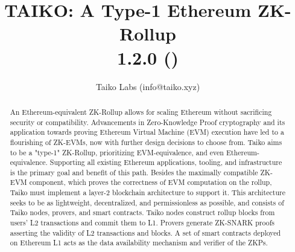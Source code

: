 \documentclass[9pt,oneside]{amsart}
\title[TAIKO: A Type-1 Ethereum ZK-Rollup\\ \smaller
\textbf{{1.2.0}}]{TAIKO: A Type-1 Ethereum ZK-Rollup \\ \smaller \textbf{{1.2.0 (\thedate)}}}
\author{Taiko Labs (info@taiko.xyz)}
\begin{document}
\pagecolor{pagecolor}

\begin{abstract}
An Ethereum-equivalent ZK-Rollup allows for scaling Ethereum without sacrificing security or compatibility. Advancements in Zero-Knowledge Proof cryptography and its application towards proving Ethereum Virtual Machine (EVM) execution have led to a flourishing of ZK-EVMs, now with further design decisions to choose from. Taiko aims to be a "type-1" ZK-Rollup, prioritizing EVM-equivalence, and even Ethereum-equivalence. Supporting all existing Ethereum applications, tooling, and infrastructure is the primary goal and benefit of this path. Besides the maximally compatible ZK-EVM component, which proves the correctness of EVM computation on the rollup, Taiko must implement a layer-2 blockchain architecture to support it. This architecture seeks to be as lightweight, decentralized, and permissionless as possible, and consists of Taiko nodes, provers, and smart contracts. Taiko nodes construct rollup blocks from users' L2 transactions and commit them to L1. Provers generate ZK-SNARK proofs asserting the validity of L2 transactions and blocks. A set of smart contracts deployed on Ethereum L1 acts as the data availability mechanism and verifier of the ZKPs.

\end{abstract}

\maketitle
\end{document}
